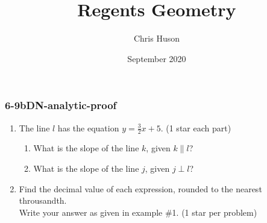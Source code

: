 \documentclass[12pt, twoside]{article}
\title{Regents Geometry}
\author{Chris Huson}
\date{September 2020}
\begin{document}
\subsubsection*{6-9bDN-analytic-proof}
\begin{enumerate}
\item The line $l$ has the equation $y=\frac{3}{2}x+5$. \hfill (1 star each part)
    \begin{enumerate}
      \item What is the slope of the line $k$, given $k \parallel l$?
      \vspace{0.5cm}
      \item What is the slope of the line $j$, given $j \perp l$?
      \vspace{0.5cm}
    \end{enumerate}

\item Find the decimal value of each expression, rounded to the nearest throusandth. \\[0.25cm]
  Write your answer as given in example \#1. \hfill (1 star per problem)
    \begin{enumerate}
    \end{enumerate}
    \vspace{1.5cm}


\end{enumerate}
\end{document}
